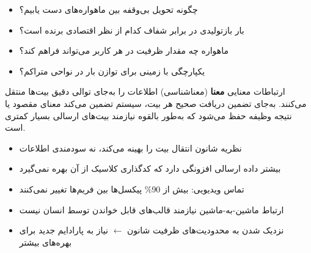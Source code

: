 
\begin{itemize}
\tightlist
\item
  چگونه تحویل بی‌وقفه بین ماهواره‌های  دست یابیم؟
\item
  بار بازتولیدی در برابر شفاف  کدام از نظر اقتصادی برنده است؟
\item
  ماهواره چه مقدار ظرفیت در هر کاربر می‌تواند فراهم کند؟
\item
  یکپارچگی با زمینی برای توازن بار در نواحی متراکم؟
\end{itemize}



\CNchained{}

\CNchained{}

ارتباطات معنایی \textbf{معنا} (معناشناسی) اطلاعات را به‌جای توالی دقیق بیت‌ها منتقل می‌کنند. به‌جای تضمین دریافت صحیح هر بیت، سیستم تضمین می‌کند معنای مقصود یا نتیجه وظیفه حفظ می‌شود که به‌طور بالقوه نیازمند بیت‌های ارسالی بسیار کمتری است.


\begin{itemize}
\tightlist
\item
  نظریه شانون انتقال بیت را بهینه می‌کند، نه سودمندی اطلاعات
\item
  بیشتر داده ارسالی افزونگی دارد که کدگذاری کلاسیک از آن بهره نمی‌گیرد
\item
  تماس ویدیویی: بیش از 90\% پیکسل‌ها بین فریم‌ها تغییر نمی‌کنند
\item
  ارتباط ماشین-به-ماشین نیازمند قالب‌های قابل خواندن توسط انسان نیست
\item
  نزدیک شدن به محدودیت‌های ظرفیت شانون \ensuremath{\leftarrow} نیاز به پارادایم جدید برای بهره‌های بیشتر
\end{itemize}





